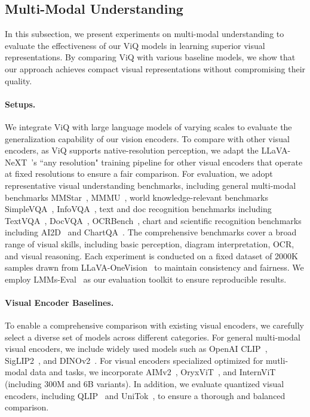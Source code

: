 \subsection{Multi-Modal Understanding}
In this subsection, we present experiments on multi-modal understanding to evaluate the effectiveness of our ViQ models in learning superior visual representations. By comparing ViQ with various baseline models, we show that our approach achieves compact visual representations without compromising their quality.

\paragraph{Setups.} We integrate ViQ with large language models of varying scales to evaluate the generalization capability of our vision encoders. To compare with other visual encoders, as ViQ supports native-resolution perception, we adapt the LLaVA-NeXT~\cite{liu2024llavanext}'s ``any resolution" training pipeline for other visual encoders that operate at fixed resolutions to ensure a fair comparison. For evaluation, we adopt representative visual understanding benchmarks, including general multi-modal benchmarks MMStar~\cite{chen2024mmstar}, MMMU~\cite{yue2024mmmu}, world knowledge-relevant benchmarks SimpleVQA~\cite{cheng2025simplevqa}, InfoVQA~\cite{mathew2022infographicvqa}, text and doc recognition benchmarks including TextVQA~\cite{singh2019textvqa}, DocVQA~\cite{mathew2021docvqa}, OCRBench~\cite{liu2023ocrbench}, chart and scientific recognition benchmarks including AI2D~\cite{kembhavi2016ai2d} and ChartQA~\cite{masry2022chartqa}. The comprehensive benchmarks cover a broad range of visual skills, including basic perception, diagram interpretation, OCR, and visual reasoning. Each experiment is conducted on a fixed dataset of 2000K samples drawn from LLaVA-OneVision~\cite{li2024llavaov} to maintain consistency and fairness. We employ LMMs-Eval~\cite{li2024lmms} as our evaluation toolkit to ensure reproducible results.

\paragraph{Visual Encoder Baselines.} To enable a comprehensive comparison with existing visual encoders, we carefully select a diverse set of models across different categories. For general multi-modal visual encoders, we include widely used models such as OpenAI CLIP~\cite{radford2021clip}, SigLIP2~\cite{tschannen2025siglip}, and DINOv2~\cite{oquab2023dinov2}. For visual encoders specialized optimized for mutli-modal data and tasks, we incorporate AIMv2~\cite{fini2025multimodal}, OryxViT~\cite{liu2024oryx}, and InternViT~\cite{zhu2025internvl3} (including 300M and 6B variants). In addition, we evaluate quantized visual encoders, including QLIP~\cite{zhao2025qlip} and UniTok~\cite{ma2025unitok}, to ensure a thorough and balanced comparison.

